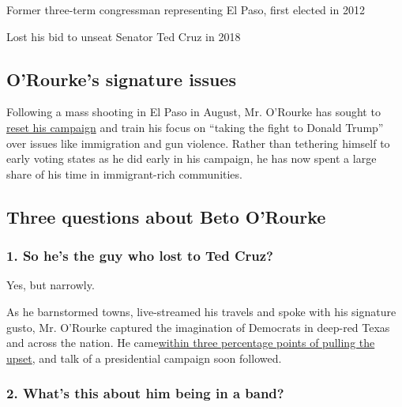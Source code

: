Former three-term congressman representing El Paso, first elected in
2012

Lost his bid to unseat Senator Ted Cruz in 2018

\hypertarget{orourkes-signature-issues}{%
\subsection{O'Rourke's signature
issues}\label{orourkes-signature-issues}}

Following a mass shooting in El Paso in August, Mr. O'Rourke has sought
to
\href{https://www.nytimes.com/2019/08/15/us/politics/beto-orourke-2020-trump.html}{reset
his campaign} and train his focus on ``taking the fight to Donald
Trump'' over issues like immigration and gun violence. Rather than
tethering himself to early voting states as he did early in his
campaign, he has now spent a large share of his time in immigrant-rich
communities.

\hypertarget{three-questions-about-beto-orourke}{%
\subsection{Three questions about Beto
O'Rourke}\label{three-questions-about-beto-orourke}}

\hypertarget{1-so-hes-the-guy-who-lost-to-ted-cruz}{%
\subsubsection{\texorpdfstring{\textbf{1. So he's the guy who lost to
Ted
Cruz?}}{1. So he's the guy who lost to Ted Cruz?}}\label{1-so-hes-the-guy-who-lost-to-ted-cruz}}

Yes, but narrowly.

As he barnstormed towns, live-streamed his travels and spoke with his
signature gusto, Mr. O'Rourke captured the imagination of Democrats in
deep-red Texas and across the nation. He
came\href{https://www.nytimes.com/elections/results/texas-senate}{}\href{https://www.nytimes.com/elections/results/texas-senate}{within
three percentage points of pulling the upset}, and talk of a
presidential campaign soon followed.

\hypertarget{2-whats-this-about-him-being-in-a-band}{%
\subsubsection{\texorpdfstring{\textbf{2. What's this about him being in
a
band?}}{2. What's this about him being in a band?}}\label{2-whats-this-about-him-being-in-a-band}}

